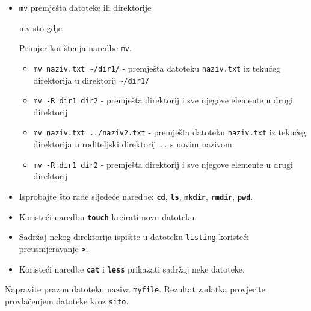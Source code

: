 \begin{itemize}
\item \texttt{mv} premješta datoteke ili direktorije
\begin{prototip}
mv sto gdje
\end{prototip}

\begin{primjer} Primjer korištenja naredbe \texttt{mv}.
\begin{itemize}
 \item \lstinline!mv naziv.txt ~/dir1/! - premješta datoteku \texttt{naziv.txt} iz tekućeg direktorija u direktorij \lstinline!~/dir1/!
 \item \lstinline!mv -R dir1 dir2! - premješta direktorij i sve njegove elemente u drugi direktorij 
\item \lstinline!mv naziv.txt ../naziv2.txt! - premješta datoteku \texttt{naziv.txt} iz tekućeg direktorija u roditeljski direktorij \texttt{..} s novim nazivom.
 \item \lstinline!mv -R dir1 dir2! - premješta direktorij i sve njegove elemente u drugi direktorij 
\end{itemize}
\end{primjer}

\end{itemize}
\begin{zadatak}
\begin{itemize}
\item Isprobajte što rade sljedeće naredbe: \textbf{\texttt{cd}}, \textbf{\texttt{ls}}, \textbf{\texttt{mkdir}}, \textbf{\texttt{rmdir}}, \textbf{\texttt{pwd}}.
\item Koristeći naredbu \textbf{\texttt{touch}} kreirati novu datoteku.
\item Sadržaj nekog direktorija ispišite u datoteku \texttt{listing} koristeći preusmjeravanje\textbf{ \texttt{>}}.
\item Koristeći naredbe \textbf{\texttt{cat}} i \textbf{\texttt{less}} prikazati sadržaj neke datoteke.
\end{itemize}

\end{zadatak}

\begin{zadatak} 
	\item Napravite praznu datoteku naziva \texttt{myfile}. Rezultat zadatka provjerite provlačenjem datoteke kroz \texttt{sito}.
\end{zadatak}

